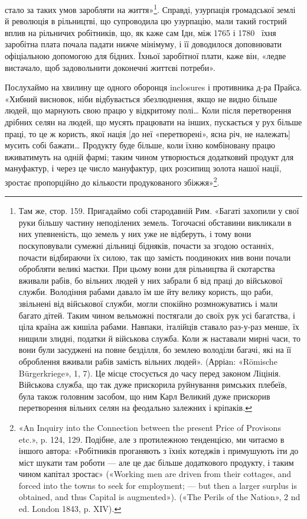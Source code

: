 стало за таких умов заробляти на життя»\footnote{
Там же, стор. 159. Пригадаймо собі стародавній Рим. «Багаті
захопили у свої руки більшу частину неподілених земель. Тогочасні
обставини викликали в них упевненість, що земель у них уже не відберуть,
і тому вони поскуповували сумежні дільниці бідняків, почасти за
згодою останніх, почасти відбираючи їх силою, так що замість поодиноких
нив вони почали обробляти великі маєтки. При цьому вони для
рільництва й скотарства вживали рабів, бо вільних людей у них забрали б
від праці до військової служби. Володіння рабами давало їм ше йту
велику користь, що раби, звільнені від військової служби, могли спокійно
розмножуватись і мали багато дітей. Таким чином вельможні постягали
до своїх рук усі багатства, і ціла країна аж кишіла рабами. Навпаки,
італійців ставало раз-у-раз менше, їх нищили злидні, податки й військова
служба. Коли ж наставали мирні часи, то вони були засуджені
на повне безділля, бо землею володіли багачі, які на її оброблення вживали
рабів замість вільних людей». (Арріаn: «Römische Bürgerkriege»,
1, 7). Це місце стосується до часу перед законом Ліцінія. Військова служба,
що так дуже прискорила руйнування римських плебеїв, була також
головним засобом, що ним Карл Великий дуже прискорив перетворення
вільних селян на феодально залежних і кріпаків.
}. Справді, узурпація
громадської землі й революція в рільництві, що супроводила
цю узурпацію, мали такий гострий вплив на рільничих робітників,
що, як каже сам Ідн, між 1765 і 1780~ їхня заробітна
\parcont{}
плата почала падати нижче мінімуму, і її доводилося доповнювати
офіціальною допомогою для бідних. Їхньої заробітної плати,
каже він, «ледве вистачало, щоб задовольнити доконечні життєві
потреби».

Послухаймо на хвилину ще одного оборонця inclosures і противника
д-ра Прайса. «Хибний висновок, ніби відбувається
збезлюднення, якщо не видно більше людей, що марнують свою
працю у відкритому полі\dots{} Коли після перетворення дрібних
селян на людей, що мусять працювати на інших, пускається у
рух більше праці, то це ж користь, якої нація [до неї «перетворені»,
ясна річ, не належать] мусить собі бажати\dots{} Продукту
буде більше, коли їхню комбіновану працю вживатимуть на
одній фармі; таким чином утворюється додатковий продукт для
мануфактур, і через це число мануфактур, цих розсипищ золота
нашої нації, зростає пропорційно до кількости продукованого
збіжжя»\footnote{
«An Inquiry into the Connection between the present Price of
Provisons etc.», p. 124, 129. Подібне, але з протилежною тенденцією, ми
читаємо в іншого автора: «Робітників проганяють з їхніх котеджів і
примушують іти до міст шукати там роботи — але це дає більше додаткового
продукту, і таким чином капітал зростає» («Working men are driven
from their cottages, and forced into the towns to seek for employment; —
but then a larger surplus is obtained, and thus Capital is augmented»).
(«The Perils of the Nation», 2 nd ed. London 1843, p. XIV).
}.

